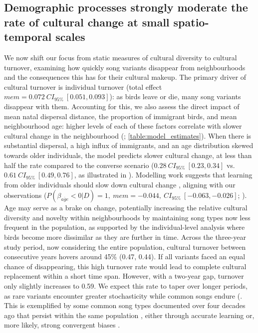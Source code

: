 \documentclass[9pt, twocolumn, twoside]{gsajnl}
\begin{document}
\subsection{Demographic processes strongly moderate the rate of cultural change at small spatio-temporal scales}

We now shift our focus from static measures of cultural diversity to cultural turnover, examining how quickly song variants disappear from neighbourhoods and the consequences this has for their cultural makeup. The primary driver of cultural turnover is individual turnover (total effect $mem = 0.072~CI_{95\%}~[0.051, 0.093]$): as birds leave or die, many song variants disappear with them. Accounting for this, we also assess the direct impact of mean natal dispersal distance, the proportion of immigrant birds, and mean neighbourhood age: higher levels of each of these factors correlate with slower cultural change in the neighbourhood (; \autoref{table:model_estimates}). When there is substantial dispersal, a high influx of immigrants, and an age distribution skewed towards older individuals, the model predicts slower cultural change, at less than half the rate compared to the converse scenario ($0.28~CI_{95\%}~[0.23, 0.34]$ vs. $0.61~CI_{95\%}~[0.49, 0.76]$, as illustrated in ).
Modelling work suggests that learning from older individuals should slow down cultural change \parencite{kirby2021}, aligning with our observations ($P(\beta_{\overline{age}} < 0 | D) = 1,~mem=-0.044,~CI_{95\%}~[-0.063, -0.026]$; ). Age may serve as a brake on change, potentially increasing the relative cultural diversity and novelty within neighbourhoods by maintaining song types now less frequent in the population, as supported by the individual-level analysis where birds become more dissimilar as they are further in time.
Across the three-year study period, now considering the entire population, cultural turnover between consecutive years hovers around 45\% (0.47, 0.44). If all variants faced an equal chance of disappearing, this high turnover rate would lead to complete cultural replacement within a short time span. However, with a two-year gap, turnover only slightly increases to 0.59. We expect this rate to taper over longer periods, as rare variants encounter greater stochasticity while common songs endure (. This is exemplified by some common song types documented over four decades ago that persist within the same population \parencite{mcgregor1982b, keen2020}, either through accurate learning or, more likely, strong convergent biases \parencite{lachlan2018, tchernichovski2021, james2017, claidiere2007}.
\end{document}
